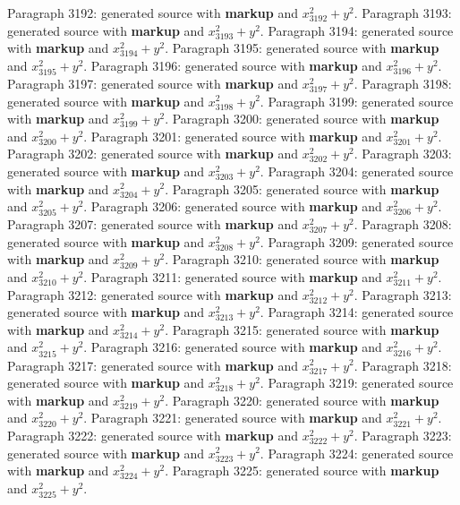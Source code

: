 \documentclass{article}
\begin{document}
Paragraph 3192: generated source with \textbf{markup} and $x_{3192}^2 + y^2$.
Paragraph 3193: generated source with \textbf{markup} and $x_{3193}^2 + y^2$.
Paragraph 3194: generated source with \textbf{markup} and $x_{3194}^2 + y^2$.
Paragraph 3195: generated source with \textbf{markup} and $x_{3195}^2 + y^2$.
Paragraph 3196: generated source with \textbf{markup} and $x_{3196}^2 + y^2$.
Paragraph 3197: generated source with \textbf{markup} and $x_{3197}^2 + y^2$.
Paragraph 3198: generated source with \textbf{markup} and $x_{3198}^2 + y^2$.
Paragraph 3199: generated source with \textbf{markup} and $x_{3199}^2 + y^2$.
Paragraph 3200: generated source with \textbf{markup} and $x_{3200}^2 + y^2$.
Paragraph 3201: generated source with \textbf{markup} and $x_{3201}^2 + y^2$.
Paragraph 3202: generated source with \textbf{markup} and $x_{3202}^2 + y^2$.
Paragraph 3203: generated source with \textbf{markup} and $x_{3203}^2 + y^2$.
Paragraph 3204: generated source with \textbf{markup} and $x_{3204}^2 + y^2$.
Paragraph 3205: generated source with \textbf{markup} and $x_{3205}^2 + y^2$.
Paragraph 3206: generated source with \textbf{markup} and $x_{3206}^2 + y^2$.
Paragraph 3207: generated source with \textbf{markup} and $x_{3207}^2 + y^2$.
Paragraph 3208: generated source with \textbf{markup} and $x_{3208}^2 + y^2$.
Paragraph 3209: generated source with \textbf{markup} and $x_{3209}^2 + y^2$.
Paragraph 3210: generated source with \textbf{markup} and $x_{3210}^2 + y^2$.
Paragraph 3211: generated source with \textbf{markup} and $x_{3211}^2 + y^2$.
Paragraph 3212: generated source with \textbf{markup} and $x_{3212}^2 + y^2$.
Paragraph 3213: generated source with \textbf{markup} and $x_{3213}^2 + y^2$.
Paragraph 3214: generated source with \textbf{markup} and $x_{3214}^2 + y^2$.
Paragraph 3215: generated source with \textbf{markup} and $x_{3215}^2 + y^2$.
Paragraph 3216: generated source with \textbf{markup} and $x_{3216}^2 + y^2$.
Paragraph 3217: generated source with \textbf{markup} and $x_{3217}^2 + y^2$.
Paragraph 3218: generated source with \textbf{markup} and $x_{3218}^2 + y^2$.
Paragraph 3219: generated source with \textbf{markup} and $x_{3219}^2 + y^2$.
Paragraph 3220: generated source with \textbf{markup} and $x_{3220}^2 + y^2$.
Paragraph 3221: generated source with \textbf{markup} and $x_{3221}^2 + y^2$.
Paragraph 3222: generated source with \textbf{markup} and $x_{3222}^2 + y^2$.
Paragraph 3223: generated source with \textbf{markup} and $x_{3223}^2 + y^2$.
Paragraph 3224: generated source with \textbf{markup} and $x_{3224}^2 + y^2$.
Paragraph 3225: generated source with \textbf{markup} and $x_{3225}^2 + y^2$.
\end{document}
